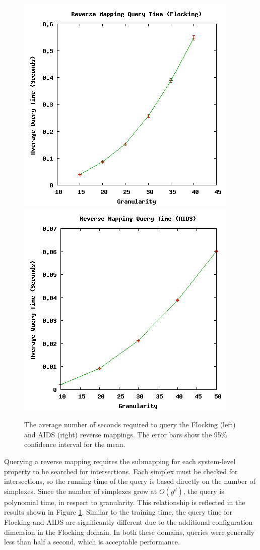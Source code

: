 \begin{figure}[ht]
\centering
\includegraphics[scale=.5]{images/results_flocking/rmquery.png}
\includegraphics[scale=.5]{images/results_aids/aids-rmquery.png}
\caption{The average number of seconds required to query the Flocking (left) and AIDS (right) reverse mappings.
The error bars show the 95\% confidence interval for the mean.}
\label{fig:farmquery}
\end{figure}



Querying a reverse mapping requires the submapping for each system-level property to be searched for intersections.
Each simplex must be checked for intersections, so the running time of the query is based directly on the number of simplexes.
Since the number of simplexes grow at $O(g^d)$, the query is polynomial time, in respect to granularity.
This relationship is reflected in the results shown in Figure \ref{fig:farmquery}.
Similar to the training time, the query time for Flocking and AIDS are significantly different due to the additional configuration dimension in the Flocking domain.
In both these domains, queries were generally less than half a second, which is acceptable performance.



